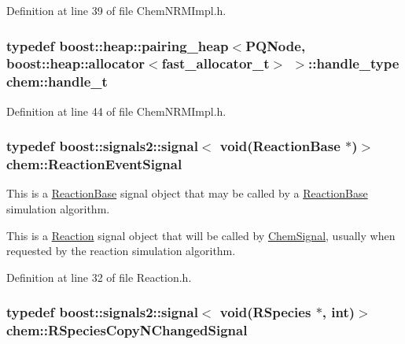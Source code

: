 Definition at line 39 of file Chem\-N\-R\-M\-Impl.\-h.

\hypertarget{namespacechem_abf1718e53f56f85003559d20e531a1a4}{
\subsubsection[{handle\-\_\-t}]{\setlength{\rightskip}{0pt plus 5cm}typedef boost\-::heap\-::pairing\-\_\-heap$<${\bf P\-Q\-Node}, boost\-::heap\-::allocator$<${\bf fast\-\_\-allocator\-\_\-t}$>$ $>$\-::handle\-\_\-type {\bf chem\-::handle\-\_\-t}}}\label{namespacechem_abf1718e53f56f85003559d20e531a1a4}


Definition at line 44 of file Chem\-N\-R\-M\-Impl.\-h.

\hypertarget{namespacechem_a40bfcc5c8ae87e2713c68fae68215991}{
\subsubsection[{Reaction\-Event\-Signal}]{\setlength{\rightskip}{0pt plus 5cm}typedef boost\-::signals2\-::signal$<$ void({\bf Reaction\-Base} $\ast$)$>$ {\bf chem\-::\-Reaction\-Event\-Signal}}}\label{namespacechem_a40bfcc5c8ae87e2713c68fae68215991}


This is a \hyperlink{classchem_1_1ReactionBase}{Reaction\-Base} signal object that may be called by a \hyperlink{classchem_1_1ReactionBase}{Reaction\-Base} simulation algorithm. 

This is a \hyperlink{classchem_1_1Reaction}{Reaction} signal object that will be called by \hyperlink{classchem_1_1ChemSignal}{Chem\-Signal}, usually when requested by the reaction simulation algorithm. 

Definition at line 32 of file Reaction.\-h.

\hypertarget{namespacechem_a6cb4144586460e7b7ae0dffdf08eb57c}{
\subsubsection[{R\-Species\-Copy\-N\-Changed\-Signal}]{\setlength{\rightskip}{0pt plus 5cm}typedef boost\-::signals2\-::signal$<$ void({\bf R\-Species} $\ast$, int)$>$ {\bf chem\-::\-R\-Species\-Copy\-N\-Changed\-Signal}}}\label{namespacechem_a6cb4144586460e7b7ae0dffdf08eb57c}


